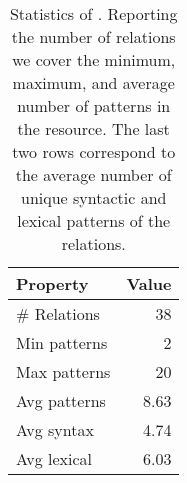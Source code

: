 \begin{table}[t]
    \centering
\begin{tabular}{lr}
\toprule
         Property &  Value \\
\midrule
    \# Relations &   38 \\
    \midrule
 Min patterns &    2 \\
 Max patterns &   20 \\
 Avg patterns &    8.63 \\
 \midrule
   Avg syntax &    4.74 \\
  Avg lexical &    6.03 \\
\bottomrule
\end{tabular}
    \caption{Statistics of \resource{}. Reporting the number of relations we cover the minimum, maximum, and average number of patterns in the resource.
    The last two rows correspond to the average number of unique syntactic and lexical patterns of the relations.}
    \label{tab:rel-graph-stats}
\end{table}